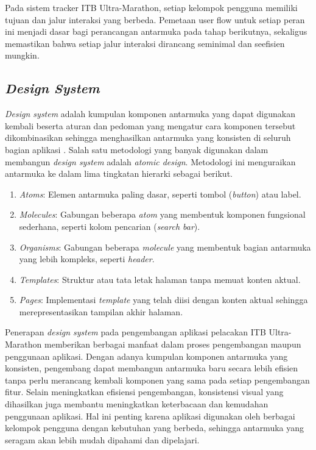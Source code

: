Pada sistem tracker ITB Ultra-Marathon, setiap kelompok pengguna memiliki tujuan dan jalur interaksi yang berbeda. Pemetaan user flow untuk setiap peran ini menjadi dasar bagi perancangan antarmuka pada tahap berikutnya, sekaligus memastikan bahwa setiap jalur interaksi dirancang seminimal dan seefisien mungkin.

\subsection{\textit{Design System}}
\textit{Design system} adalah kumpulan komponen antarmuka yang dapat digunakan kembali beserta aturan dan pedoman yang mengatur cara komponen tersebut dikombinasikan sehingga menghasilkan antarmuka yang konsisten di seluruh bagian aplikasi \cite{frost2016}. Salah satu metodologi yang banyak digunakan dalam membangun \textit{design system} adalah \textit{atomic design}. Metodologi ini menguraikan antarmuka ke dalam lima tingkatan hierarki sebagai berikut.

\begin{enumerate}
\item \textit{Atoms}: Elemen antarmuka paling dasar, seperti tombol (\textit{button}) atau label.
\item \textit{Molecules}: Gabungan beberapa \textit{atom} yang membentuk komponen fungsional sederhana, seperti kolom pencarian (\textit{search bar}).
\item \textit{Organisms}: Gabungan beberapa \textit{molecule} yang membentuk bagian antarmuka yang lebih kompleks, seperti \textit{header}.
\item \textit{Templates}: Struktur atau tata letak halaman tanpa memuat konten aktual.
\item \textit{Pages}: Implementasi \textit{template} yang telah diisi dengan konten aktual sehingga merepresentasikan tampilan akhir halaman.
\end{enumerate}
 
Penerapan \textit{design system} pada pengembangan aplikasi pelacakan ITB Ultra-Marathon memberikan berbagai manfaat dalam proses pengembangan maupun penggunaan aplikasi. Dengan adanya kumpulan komponen antarmuka yang konsisten, pengembang dapat membangun antarmuka baru secara lebih efisien tanpa perlu merancang kembali komponen yang sama pada setiap pengembangan fitur. Selain meningkatkan efisiensi pengembangan, konsistensi visual yang dihasilkan juga membantu meningkatkan keterbacaan dan kemudahan penggunaan aplikasi. Hal ini penting karena aplikasi digunakan oleh berbagai kelompok pengguna dengan kebutuhan yang berbeda, sehingga antarmuka yang seragam akan lebih mudah dipahami dan dipelajari.
 
